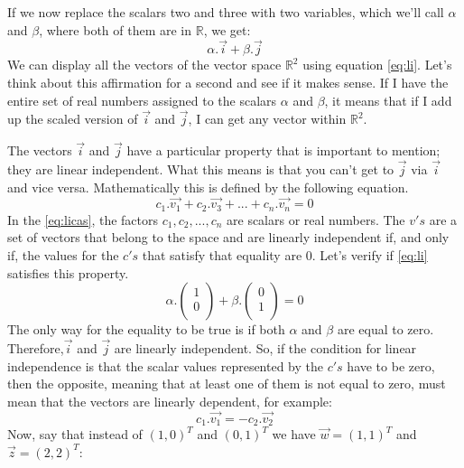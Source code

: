 \documentclass[600paper, 11pt,twoside,openany]{kdp}
\begin{document}
\indent If we now replace the scalars two and three with two variables, which we’ll call $\alpha$ and $\beta$, where both of them are in $\mathbb{R}$, we get:
\begin{equation}\label{eq:li}
\alpha.\overrightarrow{i} + \beta.\overrightarrow{j}
\end{equation} 
\indent We can display all the vectors of the vector space $\mathbb{R}^2$ using equation \ref{eq:li}. Let’s think about this affirmation for a second and see if it makes sense. If I have the entire set of real numbers assigned to the scalars $\alpha$ and $\beta$, it means that if I add up the scaled version of $\overrightarrow{i}$ and $\overrightarrow{j}$, I can get any vector within $\mathbb{R}^2$. 

\indent The vectors $\overrightarrow{i}$ and $\overrightarrow{j}$ have a particular property that is important to mention; they are linear independent. What this means is that you can’t get to $\overrightarrow{j}$ via $\overrightarrow{i}$ and vice versa. Mathematically this is defined by the following equation.
\begin{equation}
c_1.\overrightarrow{v_1} + c_2.\overrightarrow{v_3} + ... + c_n.\overrightarrow{v_n} = 0 \label{eq:licas}
\end{equation}
\indent In the \ref{eq:licas}, the factors  $c_1, c_2, ..., c_n$ are scalars or real numbers. The $v's$ are a set of vectors that belong to the space and are linearly independent if, and only if, the values for the $c's$ that satisfy that equality are 0. Let’s verify if \ref{eq:li} satisfies this property.
\[\alpha.\begin{pmatrix}
1\\
0\\
\end{pmatrix} + \beta.\begin{pmatrix}
0\\
1\\
\end{pmatrix} = 0\]
\indent The only way for the equality to be true is if both $\alpha$ and $\beta$ are equal to zero. Therefore,$\overrightarrow{i}$ and $\overrightarrow{j}$ are linearly independent. So, if the condition for linear independence is that the scalar values represented by the $c's$ have to be zero, then the opposite, meaning that at least one of them is not equal to zero, must mean that the vectors are linearly dependent, for example:
\[c_1.\overrightarrow{v_1} = -c_2.\overrightarrow{v_2}\]
\indent Now, say that instead of $(1,0)^T$ and $(0,1)^T$ we have $\overrightarrow{w} =(1,1)^T$ and $\overrightarrow{z} = (2,2)^T$:
\end{document}
